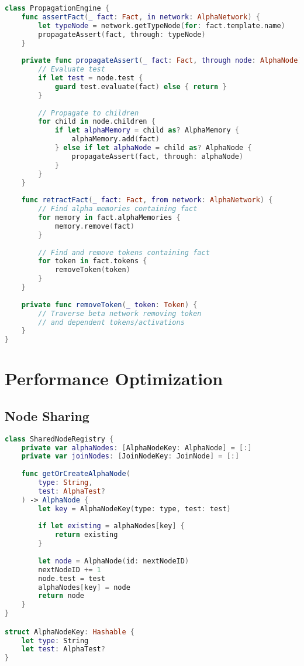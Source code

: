 \begin{lstlisting}[language=Swift]
class PropagationEngine {
    func assertFact(_ fact: Fact, in network: AlphaNetwork) {
        let typeNode = network.getTypeNode(for: fact.template.name)
        propagateAssert(fact, through: typeNode)
    }
    
    private func propagateAssert(_ fact: Fact, through node: AlphaNode) {
        // Evaluate test
        if let test = node.test {
            guard test.evaluate(fact) else { return }
        }
        
        // Propagate to children
        for child in node.children {
            if let alphaMemory = child as? AlphaMemory {
                alphaMemory.add(fact)
            } else if let alphaNode = child as? AlphaNode {
                propagateAssert(fact, through: alphaNode)
            }
        }
    }
    
    func retractFact(_ fact: Fact, from network: AlphaNetwork) {
        // Find alpha memories containing fact
        for memory in fact.alphaMemories {
            memory.remove(fact)
        }
        
        // Find and remove tokens containing fact
        for token in fact.tokens {
            removeToken(token)
        }
    }
    
    private func removeToken(_ token: Token) {
        // Traverse beta network removing token
        // and dependent tokens/activations
    }
}
\end{lstlisting}

\section{Performance Optimization}

\subsection{Node Sharing}

\begin{lstlisting}[language=Swift]
class SharedNodeRegistry {
    private var alphaNodes: [AlphaNodeKey: AlphaNode] = [:]
    private var joinNodes: [JoinNodeKey: JoinNode] = [:]
    
    func getOrCreateAlphaNode(
        type: String,
        test: AlphaTest?
    ) -> AlphaNode {
        let key = AlphaNodeKey(type: type, test: test)
        
        if let existing = alphaNodes[key] {
            return existing
        }
        
        let node = AlphaNode(id: nextNodeID)
        nextNodeID += 1
        node.test = test
        alphaNodes[key] = node
        return node
    }
}

struct AlphaNodeKey: Hashable {
    let type: String
    let test: AlphaTest?
}
\end{lstlisting}

